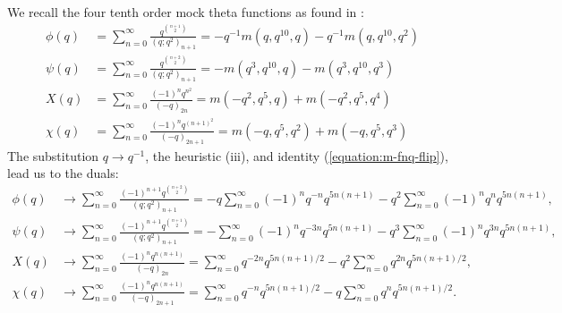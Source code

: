 \documentclass[12pt,reqno]{amsart}
\theoremstyle{remark}
\theoremstyle{definition}
\numberwithin{theorem}{section} \numberwithin{equation}{section}
\numberwithin{example}{section}
\begin{document}
{We recall the four tenth order mock theta functions as found in  \cite[Section $4$]{HM}:
{\allowdisplaybreaks \begin{align}
{\phi}(q)&=\sum_{n= 0}^{\infty}\frac{q^{\binom{n+1}{2}}}{(q;q^2)_{n+1}}=-q^{-1}m(q,q^{10},q)-q^{-1}m(q,q^{10},q^{2})\label{equation:mock-phi-10th}\\
{\psi}(q)&=\sum_{n= 0}^{\infty}\frac{q^{\binom{n+2}{2}}}{(q;q^2)_{n+1}}=-m(q^3,q^{10},q)-m(q^3,q^{10},q^{3})\label{equation:mock-psi-10th}\\
{X}(q)&=\sum_{n= 0}^{\infty}\frac{(-1)^nq^{n^2}}{(-q)_{2n}}
=m(-q^2,q^{5},q)+m(-q^2,q^{5},q^{4})\label{equation:mock-X-10th}\\
{\chi}(q)&=\sum_{n=0}^{\infty}\frac{(-1)^nq^{(n+1)^2}}{(-q)_{2n+1}}
=m(-q,q^{5},q^2)+m(-q,q^{5},q^{3})\label{equation:mock-chi-10th}
\end{align}}
The substitution $q\rightarrow q^{-1}$,  the heuristic (iii), and identity (\ref{equation:m-fnq-flip}), lead us to the duals:
\begin{align}
\phi(q)&\rightarrow \sum_{n= 0}^{\infty}\frac{(-1)^{n+1}q^{\binom{n+2}{2}}}{(q;q^2)_{n+1}}=-q\sum_{n=0}^{\infty}(-1)^nq^{-n}q^{5n(n+1)}-q^{2}\sum_{n=0}^{\infty}(-1)^nq^{n}q^{5n(n+1)},\label{equation:mock-phi-10th-dual}\\
\psi(q)&\rightarrow \sum_{n= 0}^{\infty}\frac{(-1)^{n+1}q^{\binom{n+1}{2}}}{(q;q^2)_{n+1}}=-\sum_{n=0}^{\infty}(-1)^nq^{-3n}q^{5n(n+1)}-q^{3}\sum_{n=0}^{\infty}(-1)^nq^{3n}q^{5n(n+1)},\label{equation:mock-psi-10th-dual}\\
X(q)&\rightarrow \sum_{n= 0}^{\infty}\frac{(-1)^nq^{n(n+1)}}{(-q)_{2n}}=\sum_{n=0}^{\infty}q^{-2n}q^{5n(n+1)/2}-q^2\sum_{n=0}^{\infty}q^{2n}q^{5n(n+1)/2},\label{equation:mock-X-10th-dual}\\
\chi(q)&\rightarrow \sum_{n= 0}^{\infty}\frac{(-1)^{n}q^{n(n+1)}}{(-q)_{2n+1}}=\sum_{n=0}^{\infty}q^{-n}q^{5n(n+1)/2}-q\sum_{n=0}^{\infty}q^{n}q^{5n(n+1)/2}.\label{equation:mock-chi-10th-dual}
\end{align}

}
\end{document}
